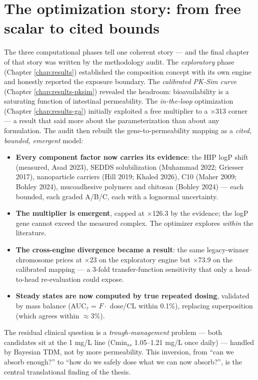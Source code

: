 \section{The optimization story: from free scalar to cited bounds}
The three computational phases tell one coherent story --- and the final chapter of that story was written by the methodology audit. The \emph{exploratory} phase (Chapter \ref{chap:results}) established the composition concept with its own engine and honestly reported the exposure boundary. The \emph{calibrated PK-Sim curve} (Chapter \ref{chap:results-pksim}) revealed the headroom: bioavailability is a saturating function of intestinal permeability. The \emph{in-the-loop} optimization (Chapter \ref{chap:results-ga}) initially exploited a free multiplier to a $\times$313 corner --- a result that said more about the parameterization than about any formulation. The audit then rebuilt the gene-to-permeability mapping as a \emph{cited, bounded, emergent} model:

\begin{itemize}
\item \textbf{Every component factor now carries its evidence}: the HIP logP shift (measured, Asad 2023), SEDDS solubilization (Muhammad 2022; Griesser 2017), nanoparticle carriers (Hill 2019; Khaled 2026), C10 (Maher 2009; Bohley 2024), mucoadhesive polymers and chitosan (Bohley 2024) --- each bounded, each graded A/B/C, each with a lognormal uncertainty.
\item \textbf{The multiplier is emergent}, capped at $\times$126.3 by the evidence; the logP gene cannot exceed the measured complex. The optimizer explores \emph{within} the literature.
\item \textbf{The cross-engine divergence became a result}: the same legacy-winner chromosome prices at $\times$23 on the exploratory engine but $\times$73.9 on the calibrated mapping --- a 3-fold transfer-function sensitivity that only a head-to-head re-evaluation could expose.
\item \textbf{Steady states are now computed by true repeated dosing}, validated by mass balance (AUC$_{\tau}$ = $F \cdot$ dose/CL within 0.1\%), replacing superposition (which agrees within $\approx$3\%).
\end{itemize}

The residual clinical question is a \emph{trough-management} problem --- both candidates sit at the 1 mg/L line (Cmin$_{ss}$ 1.05--1.21 mg/L once daily) --- handled by Bayesian TDM, not by more permeability. This inversion, from ``can we absorb enough?'' to ``how do we safely dose what we can now absorb?'', is the central translational finding of the thesis.


